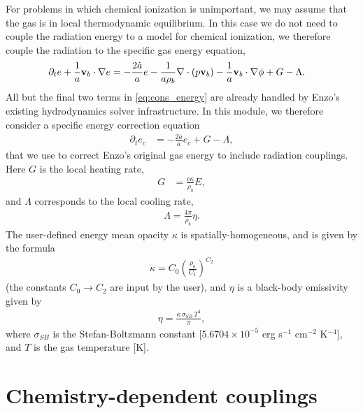 \documentclass[letterpaper,10pt]{article}
\renewcommand{\(}{\left(}
\renewcommand{\)}{\right)}
\newcommand{\vb}{{\bf v}_b}
\newcommand{\rhob}{\rho_b}
\begin{document}
For problems in which chemical ionization is unimportant, we may
assume that the gas is in local thermodynamic equilibrium.  In this
case we do not need to couple the radiation energy to a model for
chemical ionization, we therefore couple the radiation to the specific
gas energy equation, 
\begin{align}
  \label{eq:cons_energy}
  \partial_t e + \frac1a\vb\cdot\nabla e &=
    - \frac{2\dot{a}}{a}e
    - \frac{1}{a\rhob}\nabla\cdot\left(p\vb\right) 
    - \frac1a\vb\cdot\nabla\phi + G - \Lambda.
\end{align}
All but the final two terms in \eqref{eq:cons_energy} are already
handled by Enzo's existing hydrodynamics solver infrastructure.  In
this module, we therefore consider a specific energy correction equation 
\begin{align}
  \label{eq:cons_energy_correction}
  \partial_t e_c &= -\frac{2\dot{a}}{a}e_c + G - \Lambda,
\end{align}
that we use to correct Enzo's original gas energy to include radiation
couplings.  Here $G$ is the local heating rate,
\begin{align}
\label{eq:G_LTE}
  G &= \frac{c \kappa}{\rhob} E,
\end{align}
and $\Lambda$ corresponds to the local cooling rate,
\begin{align}
\label{eq:Lambda_LTE}
  \Lambda = \frac{4\pi}{\rhob} \eta.
\end{align}
The user-defined energy mean opacity $\kappa$ is
spatially-homogeneous, and is given by the formula
\begin{align}
\label{eq:opacityE}
  \kappa = C_0 \left(\frac{\rhob}{C_1}\right)^{C_2}
\end{align}
(the constants $C_0\to C_2$ are input by the user), and $\eta$ is
a black-body emissivity given by 
\begin{align}
\label{eq:etaBB}
  \eta = \frac{\kappa\,\sigma_{SB}\,T^4}{\pi},
\end{align}
where $\sigma_{SB}$ is the Stefan-Boltzmann constant [$5.6704\times
10^{-5}$ erg s$^{-1}$ cm$^{-2}$ K$^{-4}$], and $T$ is the gas
temperature [K]. 



\section{Chemistry-dependent couplings}
\label{sec:chem_model}
\end{document}
